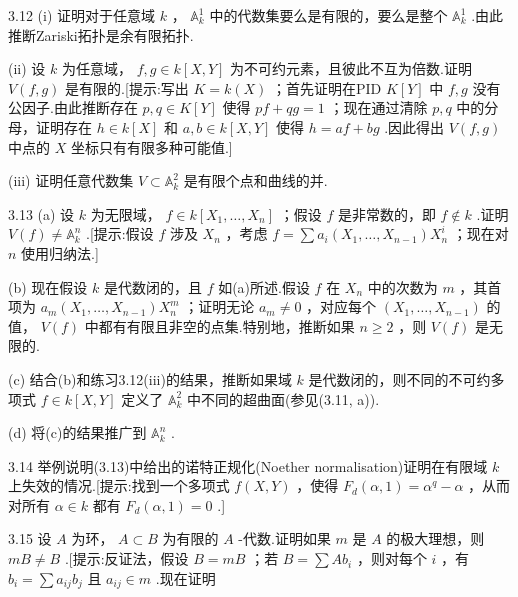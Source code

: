 3.12 (i) 证明对于任意域 \(k\) ， \({\mathbb{A}}_{k}^{1}\) 中的代数集要么是有限的，要么是整个 \({\mathbb{A}}_{k}^{1}\) .由此推断Zariski拓扑是余有限拓扑.

(ii) 设 \(k\) 为任意域， \(f,g \in  k\left\lbrack  {X,Y}\right\rbrack\) 为不可约元素，且彼此不互为倍数.证明 \(V\left( {f,g}\right)\) 是有限的.[提示:写出 \(K = k\left( X\right)\) ；首先证明在PID \(K\left\lbrack  Y\right\rbrack\) 中 \(f,g\) 没有公因子.由此推断存在 \(p,q \in  K\left\lbrack  Y\right\rbrack\) 使得 \({pf} + {qg} = 1\) ；现在通过清除 \(p,q\) 中的分母，证明存在 \(h \in  k\left\lbrack  X\right\rbrack\) 和 \(a,b \in  k\left\lbrack  {X,Y}\right\rbrack\) 使得 \(h = {af} + {bg}\) .因此得出 \(V\left( {f,g}\right)\) 中点的 \(X\) 坐标只有有限多种可能值.]

(iii) 证明任意代数集 \(V \subset  {\mathbb{A}}_{k}^{2}\) 是有限个点和曲线的并.

3.13 (a) 设 \(k\) 为无限域， \(f \in  k\left\lbrack  {{X}_{1},\ldots ,{X}_{n}}\right\rbrack\) ；假设 \(f\) 是非常数的，即 \(f \notin  k\) .证明 \(V\left( f\right)  \neq  {\mathbb{A}}_{k}^{n}\) .[提示:假设 \(f\) 涉及 \({X}_{n}\) ，考虑 \(f = \sum {a}_{i}\left( {{X}_{1},\ldots ,{X}_{n - 1}}\right) {X}_{n}^{i}\) ；现在对 \(n\) 使用归纳法.]

(b) 现在假设 \(k\) 是代数闭的，且 \(f\) 如(a)所述.假设 \(f\) 在 \({X}_{n}\) 中的次数为 \(m\) ，其首项为 \({a}_{m}\left( {{X}_{1},\ldots ,{X}_{n - 1}}\right) {X}_{n}^{m}\) ；证明无论 \({a}_{m} \neq  0\) ，对应每个 \(\left( {{X}_{1},\ldots ,{X}_{n - 1}}\right)\) 的值， \(V\left( f\right)\) 中都有有限且非空的点集.特别地，推断如果 \(n \geq  2\) ，则 \(V\left( f\right)\) 是无限的.

(c) 结合(b)和练习3.12(iii)的结果，推断如果域 \(k\) 是代数闭的，则不同的不可约多项式 \(f \in  k\left\lbrack  {X,Y}\right\rbrack\) 定义了 \({\mathbb{A}}_{k}^{2}\) 中不同的超曲面(参见(3.11, a)).

(d) 将(c)的结果推广到 \({\mathbb{A}}_{k}^{n}\) .

3.14 举例说明(3.13)中给出的诺特正规化(Noether normalisation)证明在有限域 \(k\) 上失效的情况.[提示:找到一个多项式 \(f\left( {X,Y}\right)\) ，使得 \({F}_{d}\left( {\alpha ,1}\right)  = {\alpha }^{q} - \alpha\) ，从而对所有 \(\alpha  \in  k\) 都有 \({F}_{d}\left( {\alpha ,1}\right)  = 0\) .]

3.15 设 \(A\) 为环， \(A \subset  B\) 为有限的 \(A\) -代数.证明如果 \(m\) 是 \(A\) 的极大理想，则 \({mB} \neq  B\) .[提示:反证法，假设 \(B = {mB}\) ；若 \(B = \sum A{b}_{i}\) ，则对每个 \(i\) ，有 \({b}_{i} = \sum {a}_{ij}{b}_{j}\) 且 \({a}_{ij} \in  m\) .现在证明

